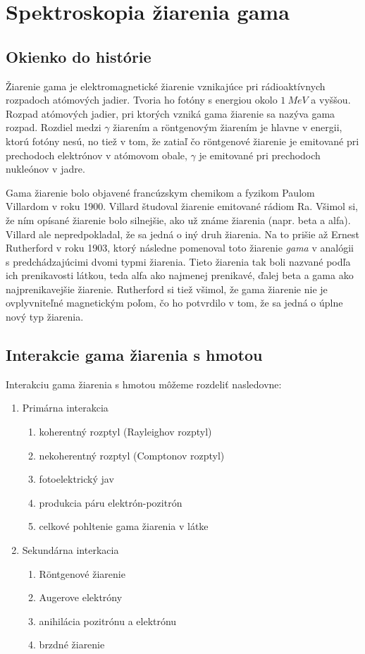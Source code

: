 \documentclass[../../main.tex]{subfiles}
\begin{document}
\chapter{Spektroskopia žiarenia gama}

\section{Okienko do histórie}
Žiarenie gama je elektromagnetické žiarenie vznikajúce pri rádioaktívnych rozpadoch atómových jadier. Tvoria ho fotóny s energiou okolo $1\:\unit{MeV}$ a vyššou. Rozpad atómových jadier, pri ktorých vzniká gama žiarenie sa nazýva gama rozpad. Rozdiel medzi $\gamma$ žiarením a r\"{o}ntgenovým žiarením je hlavne v energii, ktorú fotóny nesú, no tiež v tom, že zatiaľ čo r\"{o}ntgenové žiarenie je emitované pri prechodoch elektrónov v atómovom obale, $\gamma$ je emitované pri prechodoch nukleónov v jadre.

Gama žiarenie bolo objavené francúzskym chemikom a fyzikom Paulom Villardom v roku 1900. Villard študoval žiarenie emitované rádiom Ra. Všimol si, že ním opísané žiarenie bolo silnejšie, ako už známe žiarenia (napr. beta a alfa). Villard ale nepredpokladal, že sa jedná o iný druh žiarenia. Na to prišie až Ernest Rutherford v roku 1903, ktorý následne pomenoval toto žiarenie \textit{gama} v analógii s predchádzajúcimi dvomi typmi žiarenia. Tieto žiarenia tak boli nazvané podľa ich prenikavosti látkou, teda alfa ako najmenej prenikavé, ďalej beta a gama ako najprenikavejšie žiarenie. Rutherford si tiež všimol, že gama žiarenie nie je ovplyvniteľné magnetickým poľom, čo ho potvrdilo v tom, že sa jedná o úplne nový typ žiarenia.

\section{Interakcie gama žiarenia s hmotou}

Interakciu gama žiarenia s hmotou môžeme rozdeliť nasledovne:
\begin{enumerate}
\item Primárna interakcia
\begin{enumerate}
\item koherentný rozptyl (Rayleighov rozptyl)
\item nekoherentný rozptyl (Comptonov rozptyl)
\item fotoelektrický jav
\item produkcia páru elektrón-pozitrón
\item celkové pohltenie gama žiarenia v látke
\end{enumerate}
\item Sekundárna interkacia
\begin{enumerate}
\item R\"{o}ntgenové žiarenie
\item Augerove elektróny
\item anihilácia pozitrónu a elektrónu
\item brzdné žiarenie
\end{enumerate}
\end{enumerate}
\end{document}
